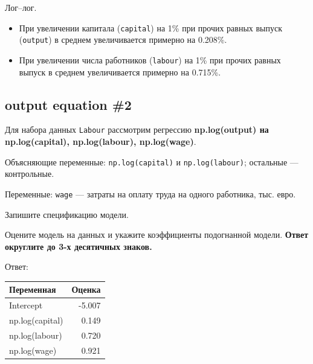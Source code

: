 \documentclass[
  russian,
]{article}
\newcounter{none} %
\providecommand{\tightlist}{%
  \setlength{\itemsep}{0pt}\setlength{\parskip}{0pt}}
\begin{document}
\begin{tcolorbox}[enhanced jigsaw, arc=.35mm, bottomrule=.15mm, bottomtitle=1mm, breakable, colback=white, colbacktitle=quarto-callout-tip-color!10!white, colframe=quarto-callout-tip-color-frame, coltitle=black, left=2mm, leftrule=.75mm, opacityback=0, opacitybacktitle=0.6, rightrule=.15mm, title=\textcolor{quarto-callout-tip-color}{\faLightbulb}\hspace{0.5em}{Ответ}, titlerule=0mm, toprule=.15mm, toptitle=1mm]

Лог--лог.

\begin{itemize}
\tightlist
\item
  При увеличении капитала (\texttt{capital}) на 1\% при прочих равных
  выпуск (\texttt{output}) в среднем увеличивается примерно на 0.208\%.
\item
  При увеличении числа работников (\texttt{labour}) на 1\% при прочих
  равных выпуск в среднем увеличивается примерно на 0.715\%.
\end{itemize}

\end{tcolorbox}

\subsection{output equation \#2}\label{output-equation-2}

Для набора данных \texttt{Labour} рассмотрим регрессию
\textbf{np.log(output) на np.log(capital), np.log(labour),
np.log(wage)}.

Объясняющие переменные: \texttt{np.log(capital)} и
\texttt{np.log(labour)}; остальные --- контрольные.

Переменные: \texttt{wage} --- затраты на оплату труда на одного
работника, тыс. евро.

Запишите спецификацию модели.

Оцените модель на данных и укажите коэффициенты подогнанной модели.
\textbf{Ответ округлите до 3-х десятичных знаков.}

Ответ:

{\def\LTcaptype{none} %
\begin{longtable}[]{@{}lr@{}}
\toprule\noalign{}
Переменная & Оценка \\
\midrule\noalign{}
\endhead
\bottomrule\noalign{}
\endlastfoot
Intercept & -5.007 \\
np.log(capital) & 0.149 \\
np.log(labour) & 0.720 \\
np.log(wage) & 0.921 \\
\end{longtable}
}
\end{document}
